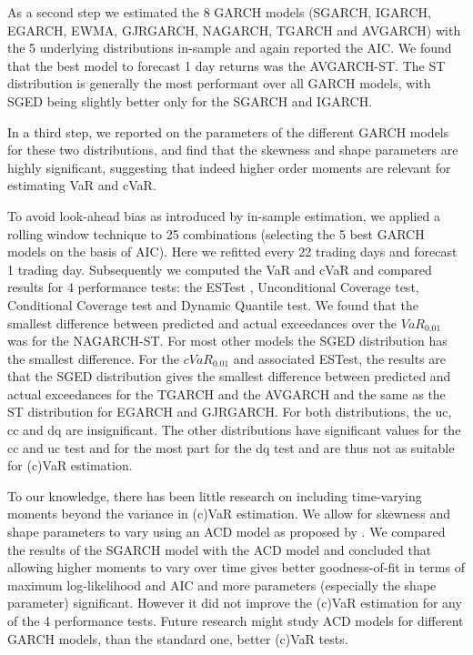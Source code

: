 \documentclass[a4paper, twoside]{templates/ociamthesis}
\begin{document}
As a second step we estimated the 8 GARCH models (SGARCH, IGARCH, EGARCH, EWMA, GJRGARCH, NAGARCH, TGARCH and AVGARCH) with the 5 underlying distributions in-sample and again reported the AIC. We found that the best model to forecast 1 day returns was the AVGARCH-ST. The ST distribution is generally the most performant over all GARCH models, with SGED being slightly better only for the SGARCH and IGARCH.

In a third step, we reported on the parameters of the different GARCH models for these two distributions, and find that the skewness and shape parameters are highly significant, suggesting that indeed higher order moments are relevant for estimating VaR and cVaR.

To avoid look-ahead bias as introduced by in-sample estimation, we applied a rolling window technique to 25 combinations (selecting the 5 best GARCH models on the basis of AIC). Here we refitted every 22 trading days and forecast 1 trading day. Subsequently we computed the VaR and cVaR and compared results for 4 performance tests: the ESTest \textcite{Mcneil}, Unconditional Coverage test, Conditional Coverage test and Dynamic Quantile test. We found that the smallest difference between predicted and actual exceedances over the \(VaR_{0.01}\) was for the NAGARCH-ST. For most other models the SGED distribution has the smallest difference. For the \(cVaR_{0.01}\) and associated ESTest, the results are that the SGED distribution gives the smallest difference between predicted and actual exceedances for the TGARCH and the AVGARCH and the same as the ST distribution for EGARCH and GJRGARCH. For both distributions, the uc, cc and dq are insignificant. The other distributions have significant values for the cc and uc test and for the most part for the dq test and are thus not as suitable for (c)VaR estimation.

To our knowledge, there has been little research on including time-varying moments beyond the variance in (c)VaR estimation. We allow for skewness and shape parameters to vary using an ACD model as proposed by \textcite{Ghalanos}. We compared the results of the SGARCH model with the ACD model and concluded that allowing higher moments to vary over time gives better goodness-of-fit in terms of maximum log-likelihood and AIC and more parameters (especially the shape parameter) significant. However it did not improve the (c)VaR estimation for any of the 4 performance tests. Future research might study ACD models for different GARCH models, than the standard one, better (c)VaR tests.
\end{document}
